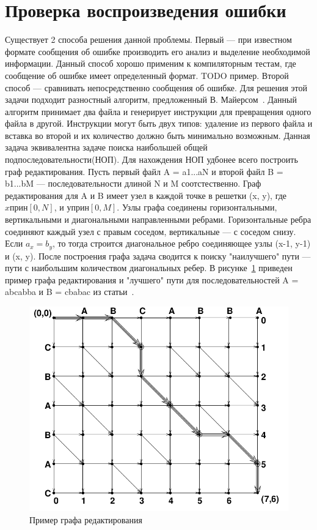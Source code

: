\section{Проверка воспроизведения ошибки}
Существует 2 способа решения данной проблемы. Первый --- при известном формате сообщения об ошибке производить его анализ и выделение необходимой информации. Данный способ хорошо применим к компиляторным тестам, где сообщение об ошибке имеет определенный формат. TODO пример. Второй способ --- сравнивать непосредственно сообщения об ошибке. Для решения этой задачи подходит разностный алгоритм, предложенный В. Майерсом~\cite{myers1986ano}. Данный алгоритм принимает два файла и генерирует инструкции для превращения одного файла в другой. Инструкции могут быть двух типов: удаление из первого файла и вставка во второй и их количество должно быть минимально возможным. Данная задача эквивалентна задаче поиска наибольшей общей подпоследовательности(НОП). Для нахождения НОП удбонее всего построить граф редактирования. Пусть первый файл A = a1...aN и второй файл B = b1...bM --- последовательности длиной N и M соотстественно. Граф редактирования для A и B имеет узел в каждой точке в решетки (x, y), где $x прин [0, N]$, и $у прин [0, M]$. Узлы графа соединены горизонтальными, вертикальными и диагональными направленными ребрами. Горизонтальные ребра соединяют каждый узел с правым соседом, вертикальные --- с соседом снизу. Если $a_x = b_y$, то тогда строится диагональное ребро соединяющее узлы (x-1, y-1) и (x, y). После построения графа задача сводится к поиску "наилучшего" пути --- пути с наибольшим количеством диагональных ребер.
В рисунке~\ref{ex:lcs} приведен пример графа редактирования и "лучшего" пути для последовательностей A = abcabba и B = cbabac из статьи~\cite{myers1986ano}.
\begin{figure}	
		\includegraphics[width=0.99\linewidth]{fig/lcsexample} 
		\caption{\label{ex:lcs}Пример графа редактирования}
\end{figure}

